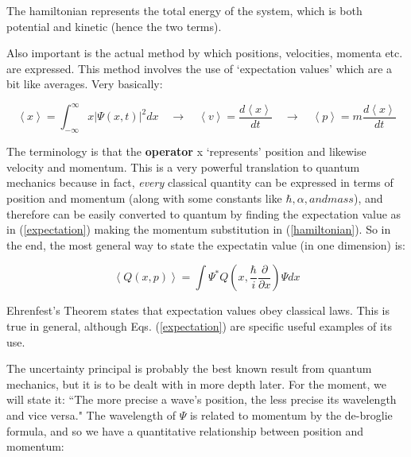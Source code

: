 \documentclass[aps,pre,nofootinbib]{revtex4}
\begin{document}
The hamiltonian represents the total energy of the system, which is both potential and kinetic (hence the two terms).  

Also important is the actual method by which positions, velocities, momenta etc. are expressed.  This method involves the use of `expectation values' which are a bit like averages.  Very basically:


\begin{equation}
\label{expectation}
\left\langle x\right\rangle =  \int_{-\infty}^{\infty}x|\Psi(x,t)|^2 dx \quad \rightarrow \quad \left\langle v\right\rangle = \frac{d \left\langle x\right\rangle }{dt} \quad \rightarrow \quad \left\langle p\right\rangle = m\frac{d \left\langle x\right\rangle }{dt}
\end{equation}

The terminology is that the \textbf{operator} x `represents' position and likewise velocity and momentum.  This is a very powerful translation to quantum mechanics because in fact, \textit{every} classical quantity can be expressed in terms of position and momentum (along with some constants like $\hbar, \alpha, and mass$), and therefore can be easily converted to quantum by finding the expectation value as in (\ref{expectation}) making the momentum substitution in (\ref{hamiltonian}).  So in the end, the most general way to state the expectatin value (in one dimension) is:

\begin{equation}
\left\langle Q(x,p)\right\rangle = \int \Psi^*Q(x,\frac{\hbar}{i}\frac{\partial}{\partial x}) \Psi dx
\end{equation}

Ehrenfest's Theorem states that expectation values obey classical laws.  This is true in general, although Eqs. (\ref{expectation}) are specific useful examples of its use.  

The uncertainty principal is probably the best known result from quantum mechanics, but it is to be dealt with in more depth later.  For the moment, we will state it: ``The more precise a wave's position, the less precise its wavelength and vice versa." The wavelength of $\Psi$ is related to momentum by the de-broglie formula, and so we have a quantitative relationship between position and momentum:
\end{document}
